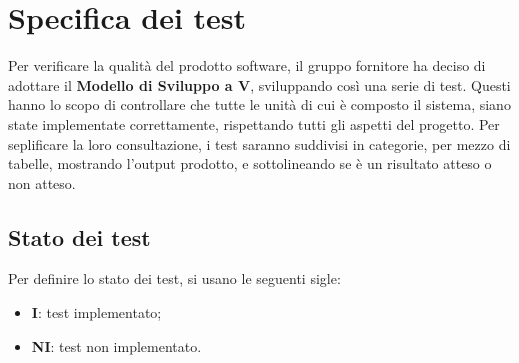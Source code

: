 \section{Specifica dei test}
Per verificare la qualità del prodotto software, il gruppo fornitore ha deciso di adottare il \textbf{Modello di Sviluppo a V}\glo, sviluppando così una serie di test. Questi hanno lo scopo di controllare che tutte le unità di cui è composto il sistema, siano state implementate correttamente, rispettando tutti gli aspetti del progetto.
Per seplificare la loro consultazione, i test saranno suddivisi in categorie, per mezzo di tabelle, mostrando l'output prodotto, e sottolineando se è un risultato atteso o non atteso.
\subsection{Stato dei test}
Per definire lo stato dei test, si usano le seguenti sigle:
\begin{itemize}
\item \textbf{I}: test implementato;
\item \textbf{NI}: test non implementato.
\end{itemize}

